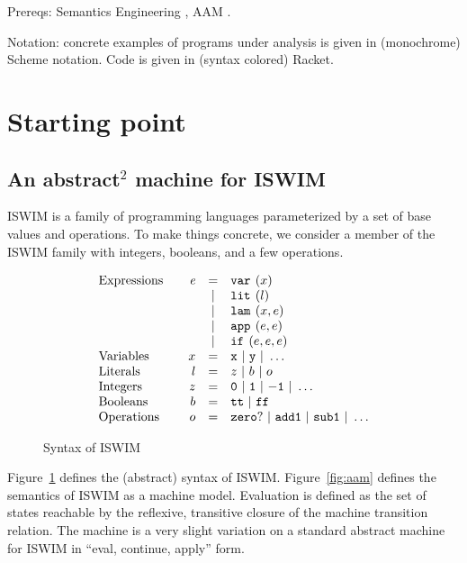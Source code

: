 \documentclass[preprint]{sigplanconf}
\begin{document}
Prereqs: Semantics Engineering \cite{dvanhorn:Felleisen2009Semantics},
AAM \cite{dvanhorn:VanHorn2011Abstracting}
\cite{dvanhorn:VanHorn2012Systematic}.

Notation: concrete examples of programs under analysis is given in
(monochrome) Scheme notation.  Code is given in (syntax colored)
Racket.

\newpage
\section{Starting point}
\subsection{An abstract$^2$ machine for ISWIM}

ISWIM is a family of programming languages parameterized by a set of
base values and operations.  To make things concrete, we consider a
member of the ISWIM family with integers, booleans, and a few
operations.

\begin{figure}
\[
\begin{array}{l@{\qquad}rcl}
\text{Expressions} & \mathit{e} &=& \svar[^\mlab]\mvar\\
&&|& \slit[^\mlab]\mlit\\
&&|& \slam[^\mlab]\mvar\mexp\\
&&|& \sapp[^\mlab]\mexp\mexp \\
&&|& \sif[^\mlab]\mexp\mexp\mexp \\
\text{Variables}&\mvar &=& \syntax{x}\ |\ \syntax{y}\ |\ \dots\\
\text{Literals}&\mlit &=& \mnum\ |\ \mbln\ |\ \mop\\
\text{Integers}&\mnum &=& \syntax{0}\ |\ \syntax{1}\ |\ \syntax{-1}\ |\ \dots\\
\text{Booleans}&\mbln &=& \strue\ |\ \sfalse\\
\text{Operations}&\mop &=& \syntax{zero?}\ |\ \syntax{add1}\ |\ \syntax{sub1}\ |\ \dots
\end{array}
\]
\caption{Syntax of ISWIM}
\label{fig:syntax}
\end{figure}

Figure~\ref{fig:syntax} defines the (abstract) syntax of ISWIM.
Figure~\ref{fig:aam} defines the semantics of ISWIM as a machine
model.  Evaluation is defined as the set of states reachable by the
reflexive, transitive closure of the machine transition relation.  The
machine is a very slight variation on a standard abstract machine for
ISWIM in ``eval, continue, apply'' form.
\end{document}

